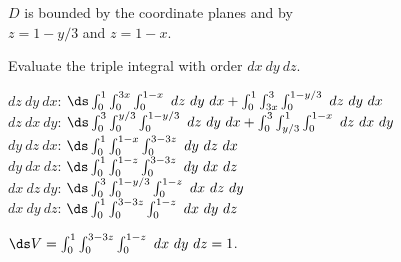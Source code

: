 {$D$ is bounded by the coordinate planes and by \\
$z=1-y/3$ and $z=1-x$.

Evaluate the triple integral with order $dx\ dy\ dz$.

}
{$dz\ dy\ dx$: $\ds\int_{0}^1\int_{0}^{3x}\int_{0}^{1-x}\ dz\ dy\ dx+\int_{0}^1\int_{3x}^{3}\int_{0}^{1-y/3}\ dz\ dy\ dx$\\
	$dz\ dx\ dy$: $\ds\int_{0}^3\int_{0}^{y/3}\int_{0}^{1-y/3}\ dz\ dy\ dx+\int_{0}^3\int_{y/3}^{1}\int_{0}^{1-x}\ dz\ dx\ dy$\\
	$dy\ dz\ dx$: $\ds\int_{0}^1\int_0^{1-x}\int_{0}^{3-3z}\ dy\ dz\ dx $\\
	$dy\ dx\ dz$: $\ds\int_0^1\int_{0}^{1-z}\int_{0}^{3-3z}\ dy\ dx\ dz$\\
	$dx\ dz\ dy$: $\ds\int_{0}^3\int_{0}^{1-y/3}\int_{0}^{1-z}\ dx\ dz\ dy$\\
	$dx\ dy\ dz$: $\ds\int_0^1\int_{0}^{3-3z}\int_{0}^{1-z}\ dx\ dy\ dz$
	
	$\ds V = \int_0^1\int_{0}^{3-3z}\int_{0}^{1-z}\ dx\ dy\ dz = 1$.
}
